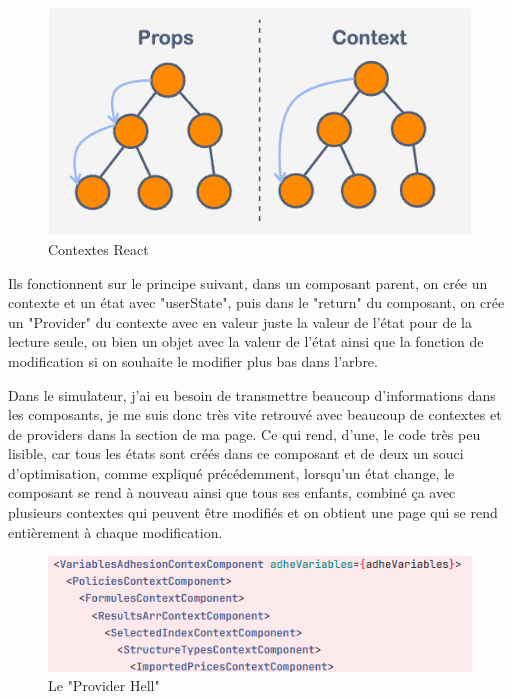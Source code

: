 \documentclass[a4paper,12pt]{report}
\begin{document}
\begin{figure}[H]
    \centering
    \includegraphics[scale=0.4]{props+vs+context.png}
    \caption{Contextes React}
    \label{fig:context-react}
\end{figure}

Ils fonctionnent sur le principe suivant, dans un composant parent, on crée un contexte et un état avec "userState", puis dans le "return" du composant, on crée un "Provider" du contexte avec en valeur juste la valeur de l'état pour de la lecture seule, ou bien un objet avec la valeur de l'état ainsi que la fonction de modification si on souhaite le modifier plus bas dans l'arbre.

Dans le simulateur, j'ai eu besoin de transmettre beaucoup d'informations dans les composants, je me suis donc très vite retrouvé avec beaucoup de contextes et de providers dans la section de ma page. Ce qui rend, d'une, le code très peu lisible, car tous les états sont créés dans ce composant et de deux un souci d'optimisation, comme expliqué précédemment, lorsqu'un état change, le composant se rend à nouveau ainsi que tous ses enfants, combiné ça avec plusieurs contextes qui peuvent être modifiés et on obtient une page qui se rend entièrement à chaque modification.

\begin{figure}[H]
    \centering
    \includegraphics[scale=0.6]{providerHell.png}
    \caption{Le "Provider Hell"}
    \label{fig:provider-hell}
\end{figure}
\end{document}
